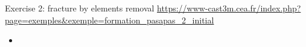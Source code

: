 


{
\begin{frame}{
                 {Exercise 2: fracture by elements removal}}
             {\url{https://www-cast3m.cea.fr/index.php?page=exemples&exemple=formation_pasapas_2_initial}}
  \small
  \begin{itemize}
    \item {}\\
  \end{itemize}
\end{frame}
}
